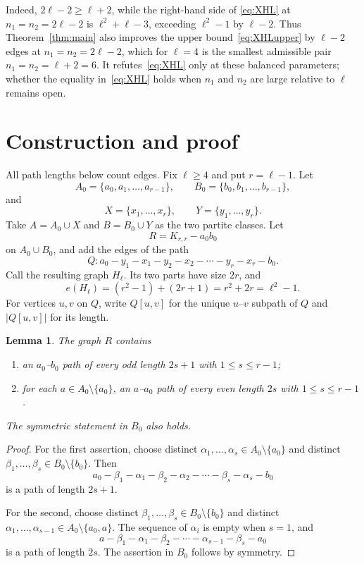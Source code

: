 \documentclass[11pt]{amsart}
\newtheorem{lemma}[theorem]{Lemma}
\begin{document}
Indeed, $2\ell-2\ge \ell+2$, while the right-hand side of
\eqref{eq:XHL} at $n_1=n_2=2\ell-2$ is
$\ell^2+\ell-3$, exceeding $\ell^2-1$ by $\ell-2$. Thus
Theorem~\ref{thm:main} also improves the upper
bound~\eqref{eq:XHLupper} by $\ell-2$ edges at $n_1=n_2=2\ell-2$,
which for $\ell=4$ is the smallest admissible pair
$n_1=n_2=\ell+2=6$. It refutes~\eqref{eq:XHL} only at these balanced
parameters; whether the equality in~\eqref{eq:XHL} holds when $n_1$
and $n_2$ are large relative to $\ell$ remains open.

\section{Construction and proof}

All path lengths below count edges. Fix $\ell\ge 4$ and put
$r=\ell-1$. Let
\[
A_0=\{a_0,a_1,\ldots,a_{r-1}\},\qquad
B_0=\{b_0,b_1,\ldots,b_{r-1}\},
\]
and
\[
X=\{x_1,\ldots,x_r\},\qquad
Y=\{y_1,\ldots,y_r\}.
\]
Take $A=A_0\cup X$ and $B=B_0\cup Y$ as the two partite classes.
Let
\[
R=K_{r,r}-a_0b_0
\]
on $A_0\cup B_0$, and add the edges of the path
\begin{equation}\label{eq:Q}
Q\colon a_0-y_1-x_1-y_2-x_2-\cdots-y_r-x_r-b_0.
\end{equation}
Call the resulting graph $H_\ell$. Its two parts have size $2r$, and
\begin{equation}\label{eq:edgecount}
e(H_\ell)=(r^2-1)+(2r+1)=r^2+2r=\ell^2-1.
\end{equation}
For vertices $u,v$ on $Q$, write $Q[u,v]$ for the unique $u$--$v$
subpath of $Q$ and $|Q[u,v]|$ for its length.

\begin{lemma}\label{lem:core}
The graph $R$ contains
\begin{enumerate}
\item an $a_0$--$b_0$ path of every odd length $2s+1$ with
      $1\le s\le r-1$;
\item for each $a\in A_0\setminus\{a_0\}$, an $a$--$a_0$ path of
      every even length $2s$ with $1\le s\le r-1$.
\end{enumerate}
The symmetric statement in $B_0$ also holds.
\end{lemma}

\begin{proof}
For the first assertion, choose distinct
$\alpha_1,\ldots,\alpha_s\in A_0\setminus\{a_0\}$ and distinct
$\beta_1,\ldots,\beta_s\in B_0\setminus\{b_0\}$. Then
\[
a_0-\beta_1-\alpha_1-\beta_2-\alpha_2-\cdots-
\beta_s-\alpha_s-b_0
\]
is a path of length $2s+1$.

For the second, choose distinct
$\beta_1,\ldots,\beta_s\in B_0\setminus\{b_0\}$ and distinct
$\alpha_1,\ldots,\alpha_{s-1}\in
A_0\setminus\{a_0,a\}$. The sequence of $\alpha_i$ is empty when
$s=1$, and
\[
a-\beta_1-\alpha_1-\beta_2-\cdots-
\alpha_{s-1}-\beta_s-a_0
\]
is a path of length $2s$. The assertion in $B_0$ follows by symmetry.
\end{proof}
\end{document}
